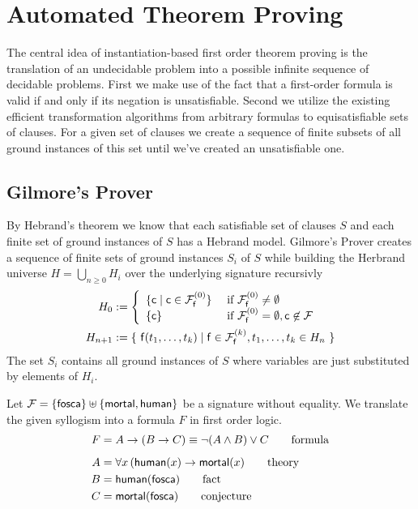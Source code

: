 
\chapter{Automated Theorem Proving}




The central idea of instantiation-based first order theorem proving is the
translation of an undecidable problem into a possible infinite sequence of decidable problems.
First we make use of the fact that a first-order formula is valid if and only if its negation is unsatisfiable.
Second we utilize the existing efficient transformation algorithms from arbitrary formulas to equisatisfiable sets of clauses. 
For a given set of clauses we create a sequence of finite subsets of all ground instances of this set
until we've created an unsatisfiable one. 




\section{Gilmore's Prover}

By Hebrand's theorem we know that each satisfiable set of clauses $S$
and each finite set of ground instances of $S$
has a Hebrand model.
Gilmore's Prover creates a sequence of finite sets of ground instances $S_i$ of $S$
while building the Herbrand universe 
$H = \bigcup_{n\geq 0} H_i$ 
over the underlying signature
recursivly
\begin{align*}
H_0 &:= \left\{ 
	\begin{array}{ll}
	\{ \mc \mid \mc\in\mcFfn[0] \} 
	&\text{if } \mcFfn[0]\not=\emptyset\\
	\{ \mc \}
	&\text{if } \mcFfn[0]=\emptyset, \mc\not\in\mcF
	\end{array}
\right. 
\\
H_{n+1} &:= \{\  
	\mf(t_1,\ldots,t_k) \mid
	\mf\in\mcFfn[k],
	t_1,\ldots,t_k \in H_n
\ \}
\end{align*}
%
The set $S_i$ contains all ground instances of $S$ where variables are just substituted by elements of $H_i$. 

\begin{example}
	Let ${\mathcal F} = \{ \mathsf{fosca} \} \uplus \{ \mathsf{mortal}, \mathsf{human} \}$ be a signature without equality. 
	We translate the given syllogism into a formula $F$ in first order logic.
	\begin{align*}
		F &= A \rightarrow (B \rightarrow C) \equiv \lnot(A\land B) \lor C 
		\tag*{formula}
		\\[0.5em]
		A &= \forall x\, ( \mathsf{human}(x) \rightarrow \mathsf{mortal}(x) 
		\tag*{theory}
		\\
		B &= \mathsf{human}(\mathsf{fosca}) 
		\tag*{fact}
		\\
		C &= \mathsf{mortal}(\mathsf{fosca})
		\tag*{conjecture}
	\end{align*}
\end{example}
 
